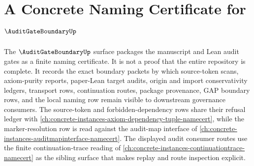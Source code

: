 \chapter{A Concrete Naming Certificate for $\AuditGateBoundaryUp$}
\label{ch:concrete-instances-auditgateboundary-namecert}

The $\AuditGateBoundaryUp$ surface packages the manuscript and Lean audit gates as a finite naming certificate. It is not a proof that the entire repository is complete. It records the exact boundary packets by which source-token scans, axiom-purity reports, paper-Lean target audits, origin and import conservativity ledgers, transport rows, continuation routes, package provenance, GAP boundary rows, and the local naming row remain visible to downstream governance consumers. The source-token and forbidden-dependency rows share their refusal ledger with \autoref{ch:concrete-instances-axiom-dependency-tuple-namecert}, while the marker-resolution row is read against the audit-map interface of \autoref{ch:concrete-instances-auditmapinterface-namecert}. The displayed audit consumer routes use the finite continuation-trace reading of \autoref{ch:concrete-instances-continuationtrace-namecert} as the sibling surface that makes replay and route inspection explicit.

